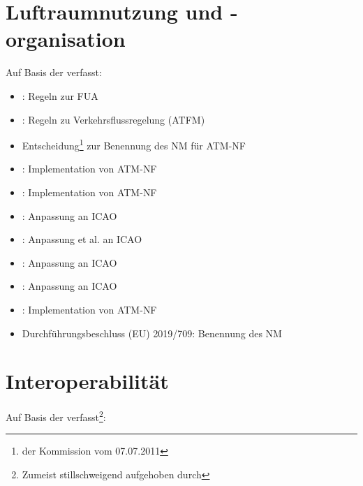 \section{Luftraumnutzung und -organisation} 
    Auf Basis der  verfasst:

    \begin{itemize}
        \item {}: Regeln zur \ac{FUA}
        \item {}: Regeln zu Verkehrsflussregelung (\acs{ATFM})
        \item Entscheidung\footnote{der Kommission vom 07.07.2011} zur Benennung des \acf{NM} für \ac{ATM}-\acs{NF}
        \item {}\textdagger: Implementation von \ac{ATM}-\ac{NF}
        \item {}: Implementation von \ac{ATM}-\acs{NF}
        \item {}: Anpassung  an \acs{ICAO}  %
        \item {}: Anpassung  {\footnotesize et al.} an \acs{ICAO}  %
        \item {}: Anpassung  an \acs{ICAO}  %
        \item {}: Anpassung  an \acs{ICAO} %
        \item {}: Implementation von \ac{ATM}-\ac{NF}
        \item Durchführungsbeschluss (\acs{EU}) 2019/709: Benennung des \ac{NM} 
    \end{itemize}

\section{Interoperabilität} 
    Auf Basis der  verfasst\footnote{Zumeist stillschweigend aufgehoben durch }:

